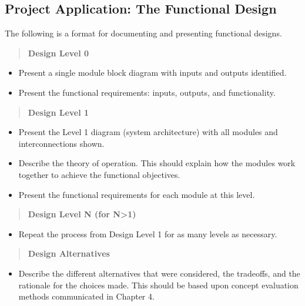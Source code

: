 \subsection{Project Application: The Functional
Design}\label{project-application-the-functional-design}

The following is a format for documenting and presenting functional
designs.

\begin{quote}
\textbf{Design Level 0}
\end{quote}

\begin{itemize}
\item
  Present a single module block diagram with inputs and outputs
  identified.
\item
  Present the functional requirements: inputs, outputs, and
  functionality.
\end{itemize}

\begin{quote}
\textbf{Design Level 1}
\end{quote}

\begin{itemize}
\item
  Present the Level 1 diagram (system architecture) with all modules and
  interconnections shown.
\item
  Describe the theory of operation. This should explain how the modules
  work together to achieve the functional objectives.
\item
  Present the functional requirements for each module at this level.
\end{itemize}

\begin{quote}
\textbf{Design Level N (for N\textgreater1)}
\end{quote}

\begin{itemize}
\item
  Repeat the process from Design Level 1 for as many levels as
  necessary.
\end{itemize}

\begin{quote}
\textbf{Design Alternatives}
\end{quote}

\begin{itemize}
\item
  Describe the different alternatives that were considered, the
  tradeoffs, and the rationale for the choices made. This should be
  based upon concept evaluation methods communicated in Chapter 4.
\end{itemize}

